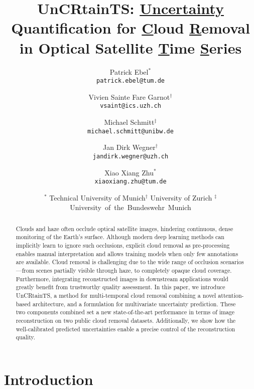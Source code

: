 \documentclass[10pt,twocolumn,letterpaper]{article}
\begin{document}
\title{UnCRtainTS: \underline{Uncertainty} Quantification for \underline{C}loud \underline{R}emoval \\ in Optical Satellite \underline{T}ime \underline{S}eries}

\author{Patrick Ebel$^{*}$\\
{\tt\small patrick.ebel@tum.de}
\and
Vivien Sainte Fare Garnot$^{\dag}$\\
{\tt\small vsaint@ics.uzh.ch}
\and
Michael Schmitt$^{\ddag}$\\
{\tt\small michael.schmitt@unibw.de}
\and
Jan Dirk Wegner$^{\dag}$\\
{\tt\small jandirk.wegner@uzh.ch}
\and
Xiao Xiang Zhu$^{*}$\\
{\tt\small xiaoxiang.zhu@tum.de}
\and
{\small $^{*}$ Technical University of Munich\quad $^{\dag}$ University of Zurich \quad  $^{\ddag}$ University~of~the~Bundeswehr~Munich
}
}


\maketitle



\begin{abstract}
Clouds and haze often occlude optical satellite images, hindering continuous, dense monitoring of the Earth's surface. Although modern deep learning methods can implicitly learn to ignore such occlusions, explicit cloud removal as pre-processing enables manual interpretation and allows training models when only few annotations are available.
Cloud removal is challenging due to the wide range of occlusion scenarios---from scenes partially visible through haze, to completely opaque cloud coverage. Furthermore, integrating reconstructed images in downstream applications would greatly benefit from trustworthy quality assessment. 
In this paper, we introduce UnCRtainTS, a method for multi-temporal cloud removal combining a novel attention-based architecture, and a formulation for multivariate uncertainty prediction. These two components combined set a new state-of-the-art performance in terms of image reconstruction on two public cloud removal datasets. Additionally, we show how the well-calibrated predicted uncertainties enable a precise control of the reconstruction quality.
\end{abstract}








\section{Introduction}
\end{document}
